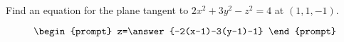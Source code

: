 \documentclass{ximera}
\author{David Guichard \and Neal Koblitz \and H. Jerome Keisler \and Albert Scheller \and Barry Balof \and Mike Wills \and Matthew Carr}
\begin{document}
\begin{exercise}




Find an equation for the plane tangent to $2x^2+3y^2-z^2=4$ at $(1,1,-1)$.

\[
\begin{prompt}
z=\answer{-2(x-1)-3(y-1)-1}
\end{prompt}
\]

\end{exercise}
\end{document}
